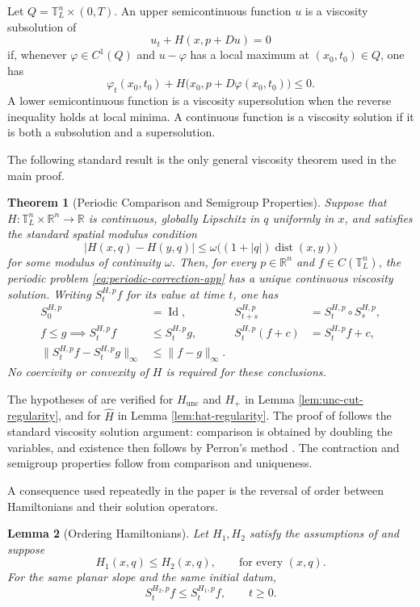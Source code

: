 \documentclass[11pt,reqno,noamsfonts]{amsart}
\newtheorem{theorem}{Theorem}[section]
\newtheorem{lemma}[theorem]{Lemma}
\theoremstyle{definition}
\theoremstyle{remark}
\newcommand{\R}{\mathbb R}
\newcommand{\T}{\mathbb T}
\newcommand{\dist}{\operatorname{dist}}
\newcommand{\Hunc}{H_{\mathrm{unc}}}
\newcommand{\Hcut}{H_{+}}
\newcommand{\Hhat}{\widehat H}
\begin{document}
Let $Q=\T_L^n\times(0,T)$. An upper semicontinuous function $u$ is a viscosity subsolution of
\[
  u_t+H(x,p+Du)=0
\]
if, whenever $\varphi\in C^1(Q)$ and $u-\varphi$ has a local maximum at $(x_0,t_0)\in Q$, one has
\[
  \varphi_t(x_0,t_0)
  +H\bigl(x_0,p+D\varphi(x_0,t_0)\bigr)\le0.
\]
A lower semicontinuous function is a viscosity supersolution when the reverse inequality holds at local minima. A continuous function is a viscosity solution if it is both a subsolution and a supersolution.

The following standard result is the only general viscosity theorem used in the main proof.

\begin{theorem}[Periodic Comparison and Semigroup Properties]\label{thm:comparison-background}
Suppose that $H:\T_L^n\times\R^n\to\R$ is continuous, globally Lipschitz in $q$ uniformly in $x$, and satisfies the standard spatial modulus condition
\[
  |H(x,q)-H(y,q)|
  \le \omega\bigl((1+|q|)\dist(x,y)\bigr)
\]
for some modulus of continuity $\omega$. Then, for every $p\in\R^n$ and $f\in C(\T_L^n)$, the periodic problem \eqref{eq:periodic-correction-app} has a unique continuous viscosity solution. Writing $S_t^{H,p}f$ for its value at time $t$, one has
\begin{align*}
  S_0^{H,p}&=\operatorname{Id},
  &S_{t+s}^{H,p}&=S_t^{H,p} \circ S_s^{H,p},\\
  f\le g\implies S_t^{H,p}f&\le S_t^{H,p}g,
  &S_t^{H,p}(f+c)&=S_t^{H,p}f+c,\\
  \|S_t^{H,p}f-S_t^{H,p}g\|_\infty
  &\le\|f-g\|_\infty.
\end{align*}
No coercivity or convexity of $H$ is required for these conclusions. 
\end{theorem}

The hypotheses of  are verified for
$\Hunc$ and $\Hcut$ in Lemma \ref{lem:unc-cut-regularity}, and for $\Hhat$
in Lemma \ref{lem:hat-regularity}. The proof of  follows the standard
viscosity solution argument: comparison is obtained by doubling the
variables, and existence then follows by Perron's method 
\cite{CrandallIshiiLions1992}. The contraction and semigroup properties follow from comparison and uniqueness.

A consequence used repeatedly in the paper is the reversal of order between Hamiltonians and their solution operators.

\begin{lemma}[Ordering Hamiltonians]\label{lem:H-order-background}
Let $H_1,H_2$ satisfy the assumptions of  and suppose
\[
  H_1(x,q)\le H_2(x,q),
  \qquad\text{for every }(x,q).
\]
For the same planar slope and the same initial datum,
\[
  S_t^{H_2,p}f\le S_t^{H_1,p}f,
  \qquad t\ge0.
\]
\end{lemma}
\end{document}
